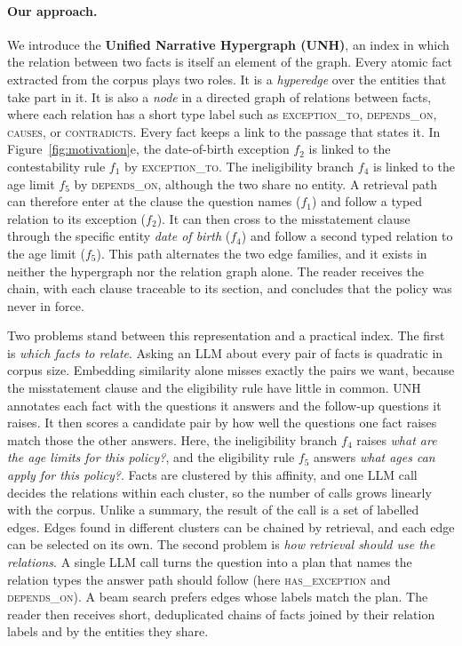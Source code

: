 \documentclass[sigconf, review, anonymous]{acmart}
\newcommand{\sys}{UNH}
\newcommand{\sysfull}{Unified Narrative Hypergraph}
\newcommand{\rel}[1]{\textsc{#1}}            %
\begin{document}
\paragraph{Our approach.}
We introduce the \textbf{\sysfull{} (\sys{})}, an index in which the relation between two facts is itself an element of the graph. Every atomic fact extracted from the corpus plays two roles. It is a \emph{hyperedge} over the entities that take part in it. It is also a \emph{node} in a directed graph of relations between facts, where each relation has a short type label such as \rel{exception\_to}, \rel{depends\_on}, \rel{causes}, or \rel{contradicts}. Every fact keeps a link to the passage that states it. In Figure~\ref{fig:motivation}e, the date-of-birth exception $f_2$ is linked to the contestability rule $f_1$ by \rel{exception\_to}. The ineligibility branch $f_4$ is linked to the age limit $f_5$ by \rel{depends\_on}, although the two share no entity. A retrieval path can therefore enter at the clause the question names ($f_1$) and follow a typed relation to its exception ($f_2$). It can then cross to the misstatement clause through the specific entity \emph{date of birth} ($f_4$) and follow a second typed relation to the age limit ($f_5$). This path alternates the two edge families, and it exists in neither the hypergraph nor the relation graph alone. The reader receives the chain, with each clause traceable to its section, and concludes that the policy was never in force.

Two problems stand between this representation and a practical index. The first is \emph{which facts to relate}. Asking an LLM about every pair of facts is quadratic in corpus size. Embedding similarity alone misses exactly the pairs we want, because the misstatement clause and the eligibility rule have little in common. \sys{} annotates each fact with the questions it answers and the follow-up questions it raises. It then scores a candidate pair by how well the questions one fact raises match those the other answers. Here, the ineligibility branch $f_4$ raises \emph{what are the age limits for this policy?}, and the eligibility rule $f_5$ answers \emph{what ages can apply for this policy?}. Facts are clustered by this affinity, and one LLM call decides the relations within each cluster, so the number of calls grows linearly with the corpus. Unlike a summary, the result of the call is a set of labelled edges. Edges found in different clusters can be chained by retrieval, and each edge can be selected on its own. The second problem is \emph{how retrieval should use the relations}. A single LLM call turns the question into a plan that names the relation types the answer path should follow (here \rel{has\_exception} and \rel{depends\_on}). A beam search prefers edges whose labels match the plan. The reader then receives short, deduplicated chains of facts joined by their relation labels and by the entities they share.
\end{document}
